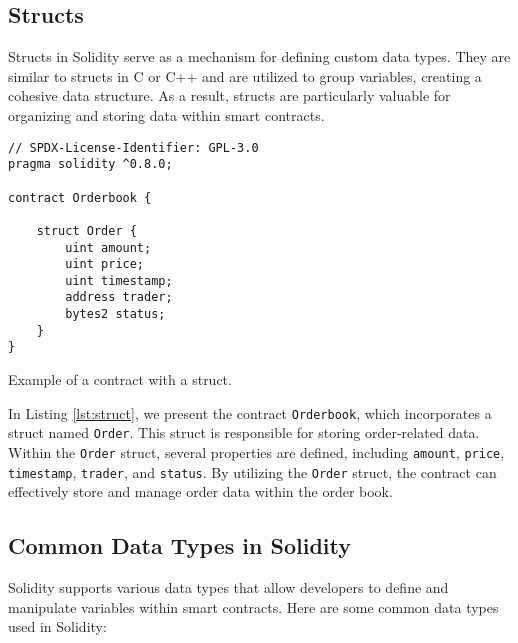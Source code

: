 
\subsection{Structs}

Structs in Solidity serve as a mechanism for defining custom data types. They are similar to structs in C or C++ and are utilized to group variables, creating a cohesive 
data structure. As a result, structs are particularly valuable for organizing and storing data within smart contracts.


\begin{listing}[!ht]
    \begin{verbatim}
// SPDX-License-Identifier: GPL-3.0
pragma solidity ^0.8.0;

contract Orderbook {

    struct Order {
        uint amount;
        uint price;
        uint timestamp;
        address trader;
        bytes2 status;
    }
}
    \end{verbatim}
    \caption{Example of a contract with a struct.}
    \label{lst:struct}
\end{listing}

In Listing \ref{lst:struct}, we present the contract \texttt{Orderbook}, which incorporates a struct named \texttt{Order}. 
This struct is responsible for storing order-related data. Within the \texttt{Order} struct, several properties are defined, including \texttt{amount}, \texttt{price}, 
\texttt{timestamp}, \texttt{trader}, and \texttt{status}. By utilizing the \texttt{Order} struct, the contract can effectively store and manage order data within the 
order book.


\subsection{Common Data Types in Solidity}

Solidity supports various data types that allow developers to define and manipulate variables within smart contracts. Here are some common data types used in Solidity:

